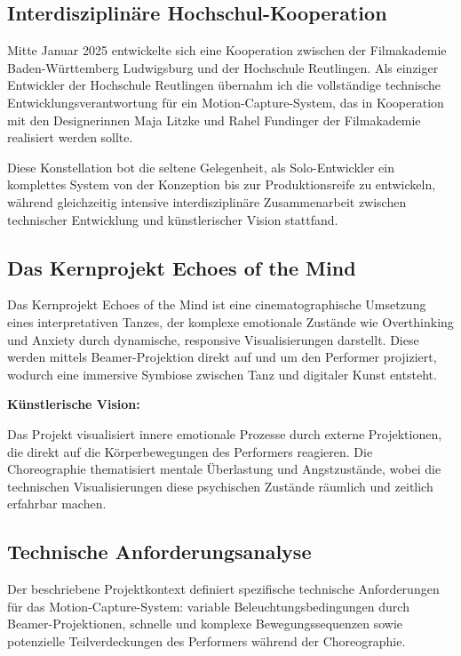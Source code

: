 
\subsection{Interdisziplinäre Hochschul-Kooperation}

Mitte Januar 2025 entwickelte sich eine Kooperation zwischen der Filmakademie Baden-Württemberg Ludwigsburg und der Hochschule Reutlingen. Als einziger Entwickler der Hochschule Reutlingen übernahm ich die vollständige technische Entwicklungsverantwortung für ein Motion-Capture-System, das in Kooperation mit den Designerinnen Maja Litzke und Rahel Fundinger der Filmakademie realisiert werden sollte.

Diese Konstellation bot die seltene Gelegenheit, als Solo-Entwickler ein komplettes System von der Konzeption bis zur Produktionsreife zu entwickeln, während gleichzeitig intensive interdisziplinäre Zusammenarbeit zwischen technischer Entwicklung und künstlerischer Vision stattfand.

\subsection{Das Kernprojekt Echoes of the Mind}

Das Kernprojekt Echoes of the Mind ist eine cinematographische Umsetzung eines interpretativen Tanzes, der komplexe emotionale Zustände wie Overthinking und Anxiety durch dynamische, responsive Visualisierungen darstellt. Diese werden mittels Beamer-Projektion direkt auf und um den Performer projiziert, wodurch eine immersive Symbiose zwischen Tanz und digitaler Kunst entsteht.



\newpage

\textbf{Künstlerische Vision:}

\raggedright Das Projekt visualisiert innere emotionale Prozesse durch externe Projektionen, die direkt auf die Körperbewegungen des Performers reagieren. Die Choreographie thematisiert mentale Überlastung und Angstzustände, wobei die technischen Visualisierungen diese psychischen Zustände räumlich und zeitlich erfahrbar machen.

\subsection{Technische Anforderungsanalyse}

Der beschriebene Projektkontext definiert spezifische technische Anforderungen für das Motion-Capture-System: variable Beleuchtungsbedingungen durch Beamer-Projektionen, schnelle und komplexe Bewegungssequenzen sowie potenzielle Teilverdeckungen des Performers während der Choreographie. 

